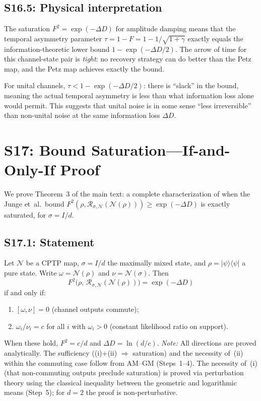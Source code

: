 \documentclass[prl,twocolumn,superscriptaddress,longbibliography]{revtex4-2}
\newcommand{\Petz}{\mathcal{R}}
\newcommand{\chan}{\mathcal{N}}
\newcommand{\ket}[1]{|#1\rangle}
\newcommand{\bra}[1]{\langle#1|}
\newcommand{\tauasym}{\tau}
\begin{document}
\subsection{S16.5: Physical interpretation}

The saturation $F^2 = \exp(-\Delta D)$ for amplitude damping
means that the temporal asymmetry parameter
$\tauasym = 1 - F = 1 - 1/\sqrt{1+\gamma}$ exactly equals the
information-theoretic lower bound $1 - \exp(-\Delta D/2)$.
The arrow of time for this channel-state pair is \emph{tight}:
no recovery strategy can do better than the Petz map, and the
Petz map achieves exactly the bound.

For unital channels, $\tauasym < 1 - \exp(-\Delta D/2)$:
there is ``slack'' in the bound, meaning the actual temporal
asymmetry is less than what information loss alone would permit.
This suggests that unital noise is in some sense ``less
irreversible'' than non-unital noise at the same information
loss $\Delta D$.

\section{S17: Bound Saturation---If-and-Only-If Proof}
\label{sec:S17}

We prove Theorem~3 of the main text: a complete characterization
of when the Junge et~al.\ bound
$F^2(\rho,\Petz_{\sigma,\chan}(\chan(\rho))) \geq \exp(-\Delta D)$
is exactly saturated, for $\sigma = I/d$.

\subsection{S17.1: Statement}

Let $\chan$ be a CPTP map, $\sigma = I/d$ the maximally mixed
state, and $\rho = \ket{\psi}\!\bra{\psi}$ a pure state.
Write $\omega = \chan(\rho)$ and $\nu = \chan(\sigma)$.  Then
\begin{equation}
F^2\!\big(\rho,\,\Petz_{\sigma,\chan}(\chan(\rho))\big)
= \exp(-\Delta D)
\end{equation}
if and only if:
\begin{enumerate}
\item[(i)] $[\omega, \nu] = 0$ (channel outputs commute);
\item[(ii)] $\omega_i/\nu_i = c$ for all $i$ with
  $\omega_i > 0$ (constant likelihood ratio on support).
\end{enumerate}
When these hold, $F^2 = c/d$ and $\Delta D = \ln(d/c)$.
\emph{Note:} All directions are proved analytically.
The sufficiency ((i)+(ii) $\Rightarrow$ saturation) and the
necessity of~(ii) within the commuting case follow from AM--GM
(Steps~1--4).
The necessity of~(i) (that non-commuting outputs preclude
saturation) is proved via perturbation theory using the classical
inequality between the geometric and logarithmic means (Step~5);
for $d = 2$ the proof is non-perturbative.
\end{document}
